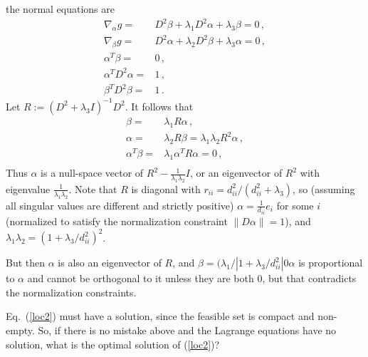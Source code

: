 \documentclass[11pt]{article}
\begin{document}
the normal equations are
\begin{equation}
    \begin{aligned}
       \nabla_{\alpha} g = & D^2 \beta + \lambda_1 D^2 \alpha + \lambda_3 \beta = 0 \,,\\
       \nabla_{\beta} g = & D^2 \alpha + \lambda_2 D^2 \beta + \lambda_3 \alpha = 0 \,,\\
        \alpha^T \beta = & 0\,,\\
        \alpha^T D^2 \alpha = & 1\,,\\
        \beta^T D^2 \beta = & 1\,.
    \end{aligned}
    \label{loc_lag1}
\end{equation}
Let $R := (D^2 + \lambda_3 I)^{-1} D^2$. It follows that
\begin{equation}
    \begin{aligned}
       \beta = & \lambda_1 R \alpha\,,\\
       \alpha = & \lambda_2 R \beta
       = \lambda_1 \lambda_2 R^2 \alpha \,,\\
        \alpha^T \beta = & \lambda_1 \alpha^T R \alpha = 0\,,\\
    \end{aligned}
    \label{loc_lag2}
\end{equation}
Thus $\alpha$ is a null-space vector of $R^2 - \frac{1}{\lambda_1 \lambda_2} I$, or an eigenvector of $R^2$ with eigenvalue $\frac{1}{\lambda_1 \lambda_2}$. Note that $R$ is diagonal with $r_{ii} = d_{ii}^2/(d_{ii}^2 + \lambda_3)$, so (assuming all singular values are different and strictly positive) $\alpha = \frac{1}{d_{ii}} e_i$ for some $i$ (normalized to satisfy the normalization constraint $\|D \alpha\|=1$), and $\lambda_1 \lambda_2 = (1 + \lambda_3/ d_{ii}^2)^2$. 

But then $\alpha$ is also an eigenvector of $R$, and $\beta = (\lambda_1 / |1 + \lambda_3/ d_{ii}^2|0 \alpha$ is proportional to $\alpha$ and cannot be orthogonal to it unless they are both $0$, but that contradicts the normalization constraints.

Eq.~(\ref{loc2}) must have a solution, since the feasible set is compact and non-empty. So, if there is no mistake above and the Lagrange equations have no solution, what is the optimal solution of (\ref{loc2})?
\end{document}
